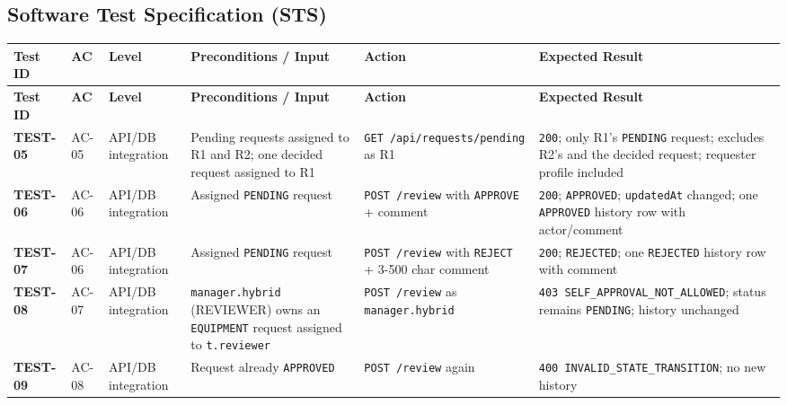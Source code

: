 \documentclass[11pt,a4paper]{article}
\begin{document}
\subsection{Software Test Specification (STS)}


\small
\vspace{0.3em}
\begin{longtable}{|>{\RaggedRight}p{1.6cm}|>{\centering\arraybackslash}p{1.4cm}|>{\centering\arraybackslash}p{1.2cm}|>{\RaggedRight}p{3.8cm}|>{\RaggedRight}p{3.8cm}|>{\RaggedRight}p{4.0cm}|}
\hline
\rowcolor{zenPale}\textbf{Test ID} & \textbf{AC} & \textbf{Level} & \textbf{Preconditions / Input} & \textbf{Action} & \textbf{Expected Result} \\ \hline
\endfirsthead
\hline
\rowcolor{zenPale}\textbf{Test ID} & \textbf{AC} & \textbf{Level} & \textbf{Preconditions / Input} & \textbf{Action} & \textbf{Expected Result} \\ \hline
\endhead
\hline
\endfoot
\textbf{TEST-05} & AC-05 & API/DB integration & Pending requests assigned to R1 and R2; one decided request assigned to R1 & \texttt{GET /\allowbreak api/\allowbreak requests/\allowbreak pending} as R1 & \texttt{200}; only R1's \texttt{PENDING} request; excludes R2's and the decided request; requester profile included \\ \hline
\textbf{TEST-06} & AC-06 & API/DB integration & Assigned \texttt{PENDING} request & \texttt{POST /\allowbreak review} with \texttt{APPROVE} + comment & \texttt{200}; \texttt{APPROVED}; \texttt{updatedAt} changed; one \texttt{APPROVED} history row with actor/comment \\ \hline
\textbf{TEST-07} & AC-06 & API/DB integration & Assigned \texttt{PENDING} request & \texttt{POST /\allowbreak review} with \texttt{REJECT} + 3-500 char comment & \texttt{200}; \texttt{REJECTED}; one \texttt{REJECTED} history row with comment \\ \hline
\textbf{TEST-08} & AC-07 & API/DB integration & \texttt{manager.\allowbreak hybrid} (REVIEWER) owns an \texttt{EQUIPMENT} request assigned to \texttt{t.\allowbreak reviewer} & \texttt{POST /\allowbreak review} as \texttt{manager.\allowbreak hybrid} & \texttt{403 SELF\_\allowbreak APPROVAL\_\allowbreak NOT\_\allowbreak ALLOWED}; status remains \texttt{PENDING}; history unchanged \\ \hline
\textbf{TEST-09} & AC-08 & API/DB integration & Request already \texttt{APPROVED} & \texttt{POST /\allowbreak review} again & \texttt{400 INVALID\_\allowbreak STATE\_\allowbreak TRANSITION}; no new history \\ \hline

\end{longtable}
\end{document}
